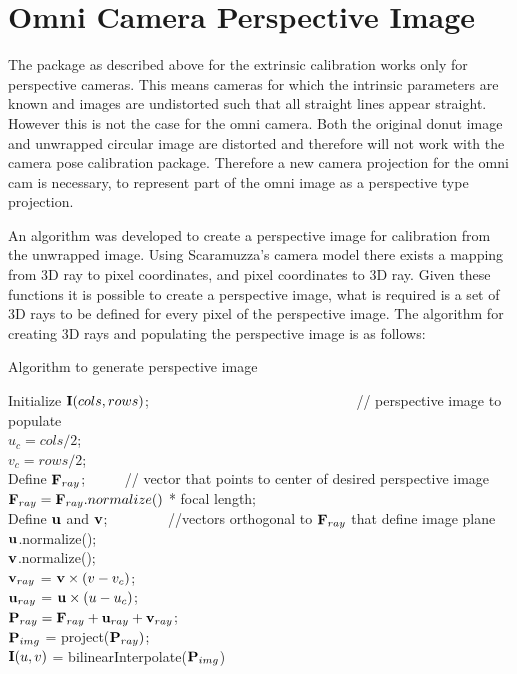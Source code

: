 \section{Omni Camera Perspective Image}
\label{sec:perspective_from_donut}

The package as described above for the extrinsic calibration works only for perspective cameras. This means cameras for which the intrinsic parameters are known and images are undistorted such that all straight lines appear straight.  However this is not the case for the omni camera.  Both the original donut image and unwrapped circular image are distorted and therefore will not work with the camera pose calibration package.  Therefore a new camera projection for the omni cam is necessary, to represent part of the omni image as a perspective type projection.

An algorithm was developed to create a perspective image for calibration from the unwrapped image.  Using Scaramuzza's camera model\cite{scaramuzza_06} there exists a  mapping from 3D ray to pixel coordinates, and pixel coordinates to 3D ray.  Given these functions it is possible to create a perspective image, what is required is a set of 3D rays to be defined for every pixel of the perspective image.  The algorithm for creating 3D rays and populating the perspective image is as follows:

\begin{algorithm}[h!]
 \caption{Algorithm to generate perspective image}
 Initialize $\mathbf I(cols,rows)$; \ \ \ \ \ \ \ \ \ \ \ \ \ \ \ \ \ \ \ \ \ \ \ \ \ \ \ \ \ 
 // perspective image to populate \\
 $u_c = cols/2$;  \\
 $v_c = rows/2$;  \\
 Define $\mathbf F_{ray}$; \ \ \ \ \ 
 // vector that points to center of desired perspective image \\
 $\mathbf F_{ray} = \mathbf F_{ray}.normalize()$ * focal length; \ \ \ \ \ \ \ \ \ \ \ \ \ \ \ \ \\
 Define $\mathbf u$ and $\mathbf v$; \ \ \ \ \ \ \ \ 
 //vectors orthogonal to $\mathbf F_{ray}$ that define image plane \\
 $\mathbf u$.normalize(); \\
 $\mathbf v$.normalize(); \\
 \For{v = 0 to rows}
 {
   $\mathbf v_{ray}$ = $\mathbf v \times (v - v_c)$; \\
   {
     $\mathbf u_{ray}$ = $\mathbf u \times (u - u_c)$; \\
     $\mathbf P_{ray} = \mathbf F_{ray} + \mathbf u_{ray} + \mathbf v_{ray}$; \\
     $\mathbf P_{img}$ = project($\mathbf P_{ray})$; \\
     $\mathbf I(u,v)$ = bilinearInterpolate($\mathbf P_{img}$)
   }
 }
\end{algorithm}

